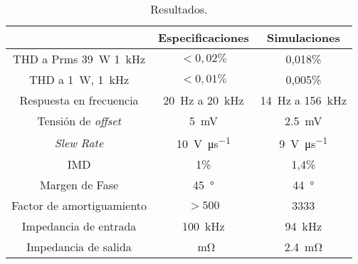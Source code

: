 \begin{table}
	\centering
	\begin{tabular}{ccc}
		\toprule
		& Especificaciones & Simulaciones \\
		\midrule
		 THD a Prms \SI{39}{\watt} \SI{1}{\kilo\hertz}& $< 0,02\%$ &  0,018\% \\
		 THD a \SI{1}{\watt}, \SI{1}{\kilo\hertz} & $< 0,01\%$ & 0,005\% \\
		 Respuesta en frecuencia & \SI{20}{\hertz} a \SI{20}{\kilo\hertz} & \SI{14}{\hertz} a \SI{156}{\kilo\hertz} \\
		 Tensión de \textit{offset} & \SI{5}{\milli\volt} & \SI{2.5}{\milli\volt} \\
		 \textit{Slew Rate} & \SI{10}{\volt\per\micro\second} &  \SI{9}{\volt\per\micro\second} \\
		 IMD & 1\% & 1,4\% \\
		 Margen de Fase & \SI{45}{\degree} &  \SI{44}{\degree} \\
		 Factor de amortiguamiento & $>500$ & 3333 \\
		 Impedancia de entrada & \SI{100}{\kilo\hertz} & \SI{94}{\kilo\hertz} \\
		 Impedancia de salida & \SI{}{\milli\ohm} & \SI{2.4}{\milli\ohm}\\
		\bottomrule
	\end{tabular}
	\caption{Resultados.}
	\label{tab.resultados}
\end{table}
